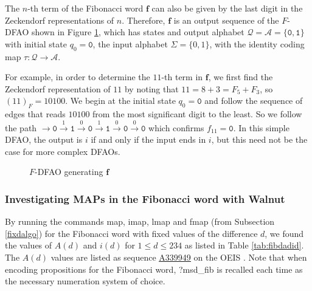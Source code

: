 \documentclass[10pt,a4paper,reqno]{amsart}
\newcommand{\seqnum}[1]{\href{https://oeis.org/#1}{\rm \underline{#1}}}
\newcommand{\bff}{{\mathbf f}}
\newcommand{\mc}{\mathcal}
\newcommand{\walnut}{{\ttfamily Walnut}}
\begin{document}
\begin{example}\label{fibdfadef}
    The $n$-th term of the Fibonacci word $\bff$ can also be given by the last digit in the Zeckendorf representations of $n$. Therefore, $\bff$ is an output sequence of the $F$-DFAO shown in Figure \ref{fibdfa_fig}, which has states and output alphabet $\mathcal{Q} =\mc A = \{\mathtt{0},\mathtt{1}\}$ with initial state $q_0 = \mathtt{0}$, the input alphabet $\Sigma = \{0,1\}$, with the identity coding map $\tau\colon \mathcal{Q} \to \mathcal{A}$.

For example, in order to determine the $11$-th term in $\bff$, we first find the Zeckendorf representation of $11$ by noting that $11 = 8+3 = F_5+F_3$, so $(11)_F = 10100$. We begin at the initial state $q_0 = \mathtt{0}$ and follow the sequence of edges that reads $10100$ from the most significant digit to the least. So we follow the path $\rightarrow\mathtt{0}\stackrel{1}{\longrightarrow} \mathtt{1} \stackrel{0}{\longrightarrow} \mathtt{0} \stackrel{1}{\longrightarrow}\mathtt{1} \stackrel{0}{\longrightarrow} \mathtt{0}\stackrel{0}{\longrightarrow} \mathtt{0}$ which confirms $f_{11} = \mathtt{0}$. In this simple DFAO, the output is $i$ if and only if the input ends in $i$, but this need not be the case for more complex DFAOs.
\end{example}
\begin{figure}[ht]
\centering
\caption{$F$-DFAO generating $\bff$}
\label{fibdfa_fig}
\end{figure}

\subsubsection{Investigating MAPs in the {F}ibonacci word with {\walnut}}\label{SEC:fibwalnutres}
By running the commands {\ttfamily map}, {\ttfamily imap}, {\ttfamily lmap} and {\ttfamily fmap} (from Subsection \ref{fixdalgo}) for the Fibonacci word with fixed values of the difference $d$, we found the values of $A(d)$ and $i(d)$ for $1 \leq d \leq 234$ as listed in Table \ref{tab:fibdadid}. The $A(d)$ values are listed as sequence \seqnum{A339949} on the OEIS \cite{oeis}. Note that when encoding propositions for the  Fibonacci word, {\ttfamily ?msd\_fib} is recalled each time as the necessary numeration system of choice.
\end{document}
